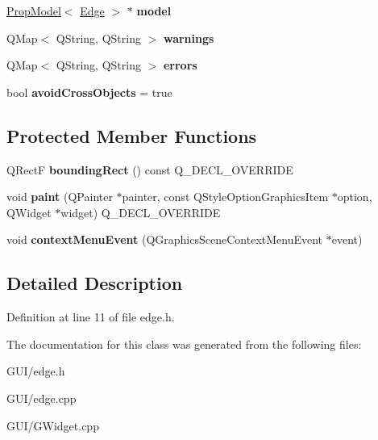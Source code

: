 \begin{DoxyCompactItemize}
\item 
\mbox{\label{class_edge_a5606c6dd7b803e67705b9c5601729e5d}} 
\hyperlink{class_prop_model}{Prop\+Model}$<$ \hyperlink{class_edge}{Edge} $>$ $\ast$ {\bfseries model}
\item 
\mbox{\label{class_edge_af3f7a9c2f6b24950a53da4871dae1ba8}} 
Q\+Map$<$ Q\+String, Q\+String $>$ {\bfseries warnings}
\item 
\mbox{\label{class_edge_a5c4a5000335bc41cc5f256100e191b7f}} 
Q\+Map$<$ Q\+String, Q\+String $>$ {\bfseries errors}
\item 
\mbox{\label{class_edge_a43546122781fe91ab3490f1e977f0ba5}} 
bool {\bfseries avoid\+Cross\+Objects} = true
\end{DoxyCompactItemize}
\subsection*{Protected Member Functions}
\begin{DoxyCompactItemize}
\item 
\mbox{\label{class_edge_a02a869b182dfb09f04be5ee3f0ce56dd}} 
Q\+RectF {\bfseries bounding\+Rect} () const Q\+\_\+\+D\+E\+C\+L\+\_\+\+O\+V\+E\+R\+R\+I\+DE
\item 
\mbox{\label{class_edge_a8e9131800530a799730d2f6dbee21187}} 
void {\bfseries paint} (Q\+Painter $\ast$painter, const Q\+Style\+Option\+Graphics\+Item $\ast$option, Q\+Widget $\ast$widget) Q\+\_\+\+D\+E\+C\+L\+\_\+\+O\+V\+E\+R\+R\+I\+DE
\item 
\mbox{\label{class_edge_a3af68f426a5a2b89a8600ebaf1151cff}} 
void {\bfseries context\+Menu\+Event} (Q\+Graphics\+Scene\+Context\+Menu\+Event $\ast$event)
\end{DoxyCompactItemize}


\subsection{Detailed Description}


Definition at line 11 of file edge.\+h.



The documentation for this class was generated from the following files\+:\begin{DoxyCompactItemize}
\item 
G\+U\+I/edge.\+h\item 
G\+U\+I/edge.\+cpp\item 
G\+U\+I/G\+Widget.\+cpp\end{DoxyCompactItemize}
